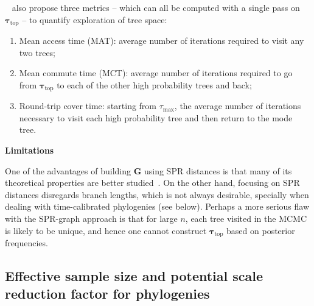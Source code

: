 ~\cite{Whidden2015} also propose three metrics -- which can all be computed with a single pass on $\boldsymbol\tau_{\text{top}}$ -- to quantify exploration of tree space:
\begin{enumerate}
 \item Mean access time (MAT): average number of iterations required to visit any two trees;
 \item Mean commute time (MCT): average number of iterations required to go from $\boldsymbol \tau_{\text{top}}$ to each of the other high probability trees and back;
 \item Round-trip cover time: starting from $\tau_{\text{max}}$, the average number of iterations necessary to visit each high probability tree and then return to the mode tree. 
\end{enumerate}

\textbf{Limitations}

One of the advantages of building $\boldsymbol G$ using SPR distances is that many of its theoretical properties are better studied~\citep{Whidden2017}.
On the other hand, focusing on SPR distances disregards branch lengths, which is not always desirable, specially when dealing with time-calibrated phylogenies (see below).
Perhaps a more serious flaw with the SPR-graph approach is that for large $n$,  each tree visited in the MCMC is likely to be unique, and hence one cannot construct $\boldsymbol \tau_{\text{top}}$ based on posterior frequencies.

\subsection{Effective sample size and potential scale reduction factor for phylogenies}
\label{sec:treeESS}

